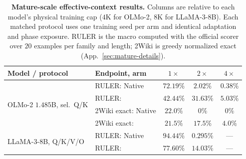 \begin{table}[tb]
\centering
\footnotesize
\setlength{\tabcolsep}{4pt}
\renewcommand{\arraystretch}{0.96}
\caption{\textbf{Mature-scale effective-context results.} Columns are relative
to each model's physical training cap ($4$K for OLMo-2, $8$K for LLaMA-3-8B).
Each matched protocol uses one training seed per arm and identical adaptation
and phase exposure. RULER is the macro computed with the official scorer over
$20$ examples per family and length; 2Wiki is greedy normalized exact
(App.~\ref{sec:mature-details}).}
\label{tab:mature}
\begin{tabular}{@{}llccc@{}}
\toprule
Model / protocol & Endpoint, arm & $1\times$ & $2\times$ & $4\times$ \\
\midrule
\multirow{4}{*}{OLMo-2 $1.485$B, sel.\ Q/K}
 & RULER: Native & $\mathbf{72.19\%}$ & $2.02\%$ & $0.38\%$ \\
 & RULER: \evq{} & $42.44\%$ & $\mathbf{31.63\%}$ & $\mathbf{5.03\%}$ \\
 & 2Wiki exact: Native & $\mathbf{22.0\%}$ & $0\%$ & $0\%$ \\
 & 2Wiki exact: \evq{} & $21.5\%$ & $\mathbf{17.5\%}$ & $\mathbf{4.0\%}$ \\
\multirow{2}{*}{LLaMA-3-8B, Q/K/V/O}
 & RULER: Native & $\mathbf{94.44\%}$ & $0.295\%$ & --- \\
 & RULER: \evq{} & $77.60\%$ & $\mathbf{14.03\%}$ & --- \\
\bottomrule
\end{tabular}
\end{table}
